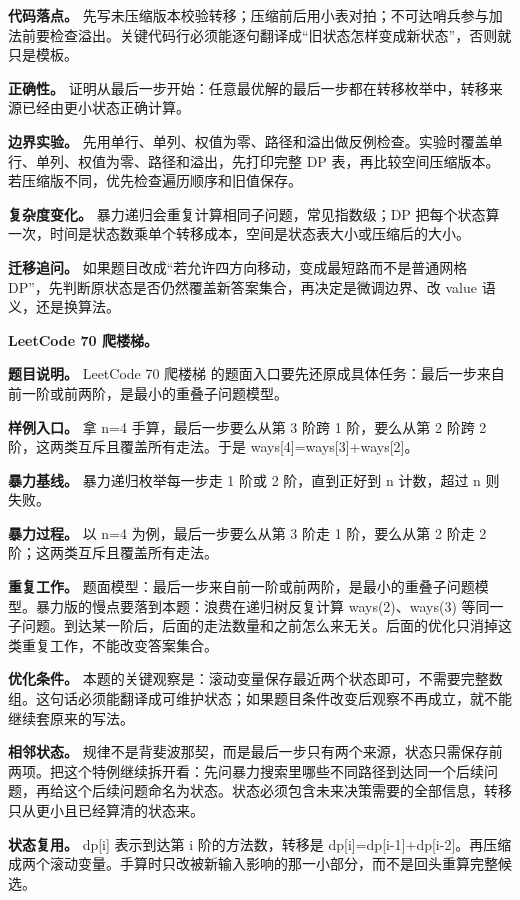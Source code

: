 \textbf{代码落点。} 先写未压缩版本校验转移；压缩前后用小表对拍；不可达哨兵参与加法前要检查溢出。关键代码行必须能逐句翻译成“旧状态怎样变成新状态”，否则就只是模板。

\textbf{正确性。} 证明从最后一步开始：任意最优解的最后一步都在转移枚举中，转移来源已经由更小状态正确计算。

\textbf{边界实验。} 先用单行、单列、权值为零、路径和溢出做反例检查。实验时覆盖单行、单列、权值为零、路径和溢出，先打印完整 DP 表，再比较空间压缩版本。若压缩版不同，优先检查遍历顺序和旧值保存。

\textbf{复杂度变化。} 暴力递归会重复计算相同子问题，常见指数级；DP 把每个状态算一次，时间是状态数乘单个转移成本，空间是状态表大小或压缩后的大小。

\textbf{迁移追问。} 如果题目改成“若允许四方向移动，变成最短路而不是普通网格 DP”，先判断原状态是否仍然覆盖新答案集合，再决定是微调边界、改 value 语义，还是换算法。

\noindent\textbf{LeetCode 70 爬楼梯。}

\textbf{题目说明。} LeetCode 70 爬楼梯 的题面入口要先还原成具体任务：最后一步来自前一阶或前两阶，是最小的重叠子问题模型。

\textbf{样例入口。} 拿 n=4 手算，最后一步要么从第 3 阶跨 1 阶，要么从第 2 阶跨 2 阶，这两类互斥且覆盖所有走法。于是 ways[4]=ways[3]+ways[2]。

\textbf{暴力基线。} 暴力递归枚举每一步走 1 阶或 2 阶，直到正好到 n 计数，超过 n 则失败。

\textbf{暴力过程。} 以 n=4 为例，最后一步要么从第 3 阶走 1 阶，要么从第 2 阶走 2 阶；这两类互斥且覆盖所有走法。

\textbf{重复工作。} 题面模型：最后一步来自前一阶或前两阶，是最小的重叠子问题模型。暴力版的慢点要落到本题：浪费在递归树反复计算 ways(2)、ways(3) 等同一子问题。到达某一阶后，后面的走法数量和之前怎么来无关。后面的优化只消掉这类重复工作，不能改变答案集合。

\textbf{优化条件。} 本题的关键观察是：滚动变量保存最近两个状态即可，不需要完整数组。这句话必须能翻译成可维护状态；如果题目条件改变后观察不再成立，就不能继续套原来的写法。

\textbf{相邻状态。} 规律不是背斐波那契，而是最后一步只有两个来源，状态只需保存前两项。把这个特例继续拆开看：先问暴力搜索里哪些不同路径到达同一个后续问题，再给这个后续问题命名为状态。状态必须包含未来决策需要的全部信息，转移只从更小且已经算清的状态来。

\textbf{状态复用。} dp[i] 表示到达第 i 阶的方法数，转移是 dp[i]=dp[i-1]+dp[i-2]。再压缩成两个滚动变量。手算时只改被新输入影响的那一小部分，而不是回头重算完整候选。

